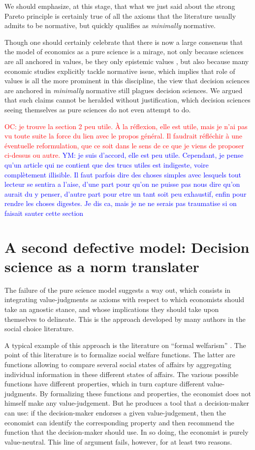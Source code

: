 \documentclass[preprint, french, english, 11pt]{elsarticle}%
\newcommand{\commentYM}[1]{\textcolor{blue}{YM: #1}}
\newcommand{\commentOC}[1]{\textcolor{red}{OC: #1}}
\begin{document}
We should emphasize, at this stage, that what we just said about the strong Pareto principle is certainly true of all the axioms that the literature usually admits to be normative, but quickly qualifies as \emph{minimally} normative.

Though one should certainly celebrate that there is now a large consensus that the model of economics as a pure science is a mirage, not only because sciences are all anchored in values, be they only epistemic values \cite{longino_science_1990}, but also because many economic studies explicitly tackle normative issue, which implies that role of values is all the more prominent in this discipline, the view that decision sciences are anchored in \emph{minimally} normative still plagues decision sciences. We argued that such claims cannot be heralded without justification, which decision sciences seeing themselves as pure sciences do not even attempt to do. 

\commentOC{je trouve la section 2 peu utile. À la réflexion, elle est utile, mais je n’ai pas vu toute suite la force du lien avec le propos général. Il faudrait réfléchir à une éventuelle reformulation, que ce soit dans le sens de ce que je viens de proposer ci-dessus ou autre.}
\commentYM{je suis d'accord, elle est peu utile. Cependant, je pense qu'un article qui ne contient que des trucs utiles est indigeste, voire complètement illisible. Il faut parfois dire des choses simples avec lesquels tout lecteur se sentira a l'aise, d'une part pour qu'on ne puisse pas nous dire qu'on aurait du y penser, d'autre part pour etre un tant soit peu exhaustif, enfin pour rendre les choses digestes. Je dis ca, mais je ne ne serais pas traumatise si on faisait sauter cette section}

\section{A second defective model: Decision science as a norm translater}
\noindent The failure of the pure science model suggests a way out, which consists in integrating value-judgments as axioms with respect to which economists should take an agnostic stance, and whose implications they should take upon themselves to delineate. This is the approach developed by many authors in the social choice literature.

A typical example of this approach is the literature on ``formal welfarism'' \cite{fleurbaey_informational_2003}. The point of this literature is to formalize social welfare functions. The latter are functions allowing to compare several social states of affairs by aggregating individual information in these different states of affairs. The various possible functions have different properties, which in turn capture different value-judgments. By formalizing these functions and properties, the economist does not himself make any value-judgement. But he produces a tool that a decision-maker can use: if the decision-maker endorses a given value-judgement, then the economist can identify the corresponding property and then recommend the function that the decision-maker should use. In so doing, the economist is purely value-neutral. This line of argument fails, however, for at least two reasons.
\end{document}
